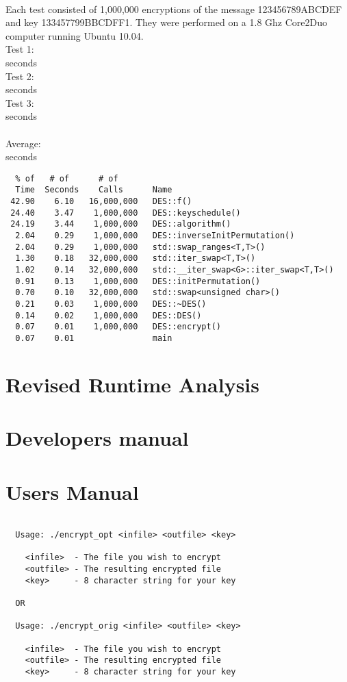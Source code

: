 \documentclass[10pt]{article}
\begin{document}
\paragraph{}Each test consisted of 1,000,000 encryptions of the message 123456789ABCDEF and key 133457799BBCDFF1. They were performed on a 1.8 Ghz Core2Duo computer running Ubuntu 10.04.
\\Test 1:
\\  seconds
\\Test 2:
\\  seconds
\\Test 3:
\\  seconds
\\\\Average:
\\  seconds
\begin{verbatim}
  % of   # of      # of                  
  Time  Seconds    Calls      Name    
 42.90    6.10   16,000,000   DES::f()
 24.40    3.47    1,000,000   DES::keyschedule()
 24.19    3.44    1,000,000   DES::algorithm()
  2.04    0.29    1,000,000   DES::inverseInitPermutation()
  2.04    0.29    1,000,000   std::swap_ranges<T,T>()
  1.30    0.18   32,000,000   std::iter_swap<T,T>()
  1.02    0.14   32,000,000   std::__iter_swap<G>::iter_swap<T,T>()
  0.91    0.13    1,000,000   DES::initPermutation()
  0.70    0.10   32,000,000   std::swap<unsigned char>()
  0.21    0.03    1,000,000   DES::~DES()
  0.14    0.02    1,000,000   DES::DES()
  0.07    0.01    1,000,000   DES::encrypt()
  0.07    0.01                main
\end{verbatim}
\section{Revised Runtime Analysis}
\section{Developers manual}
\section{Users Manual}

\begin{verbatim}

  Usage: ./encrypt_opt <infile> <outfile> <key>

    <infile>  - The file you wish to encrypt
    <outfile> - The resulting encrypted file
    <key>     - 8 character string for your key

  OR

  Usage: ./encrypt_orig <infile> <outfile> <key>

    <infile>  - The file you wish to encrypt
    <outfile> - The resulting encrypted file
    <key>     - 8 character string for your key


\end{verbatim}
\end{document}
